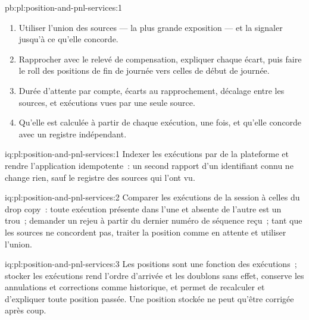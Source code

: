 \begin{solution}{pb:pl:position-and-pnl-services:1}
\begin{enumerate}
220 et 28.4~\$ avec le drop copy, aucun avec le drop copy et l'annulation appliquée~; le service complet concorde avec le relevé à partir de l'avis d'annulation,
vingt minutes après la transaction annulée, et reste en attente pendant environ une minute après chaque coupure ayant fait perdre des exécutions.
\item Utiliser l'union des sources --- la plus grande exposition --- et la signaler jusqu'à ce qu'elle concorde.
\item Rapprocher avec le relevé de compensation, expliquer chaque écart, puis faire le roll des positions de fin de journée vers celles de début de journée.
\item Durée d'attente par compte, écarts au rapprochement, décalage entre les sources, et exécutions vues par une seule source.
\item Qu'elle est calculée à partir de chaque exécution, une fois, et qu'elle concorde avec un registre indépendant.
\end{enumerate}
\end{solution}

\begin{solution}{iq:pl:position-and-pnl-services:1}
Indexer les exécutions par  de la plateforme et rendre l'application idempotente~: un second rapport d'un identifiant connu ne change rien,
sauf le registre des sources qui l'ont vu.
\end{solution}

\begin{solution}{iq:pl:position-and-pnl-services:2}
Comparer les exécutions de la session à celles du drop copy~: toute exécution présente dans l'une et absente de l'autre est un trou~; demander un rejeu
à partir du dernier numéro de séquence reçu~; tant que les sources ne concordent pas, traiter la position comme en attente et utiliser l'union.
\end{solution}

\begin{solution}{iq:pl:position-and-pnl-services:3}
Les positions sont une fonction des exécutions~; stocker les exécutions rend l'ordre d'arrivée et les doublons sans effet, conserve les annulations et corrections comme
historique, et permet de recalculer et d'expliquer toute position passée. Une position stockée ne peut qu'être corrigée après coup.
\end{solution}

